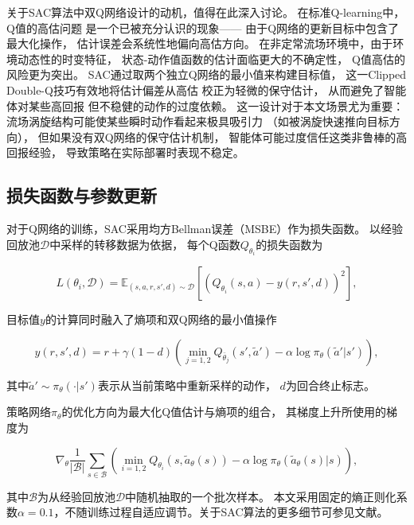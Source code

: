 关于SAC算法中双Q网络设计的动机，值得在此深入讨论。
在标准Q-learning中，Q值的高估问题
是一个已被充分认识的现象——
由于Q网络的更新目标中包含了最大化操作，
估计误差会系统性地偏向高估方向。
在非定常流场环境中，由于环境动态性的时变特征，
状态-动作值函数的估计面临更大的不确定性，
Q值高估的风险更为突出。
SAC通过取两个独立Q网络的最小值来构建目标值，
这一Clipped Double-Q技巧有效地将估计偏差从高估
校正为轻微的保守估计，
从而避免了智能体对某些高回报
但不稳健的动作的过度依赖。
这一设计对于本文场景尤为重要：
流场涡旋结构可能使某些瞬时动作看起来极具吸引力
（如被涡旋快速推向目标方向），
但如果没有双Q网络的保守估计机制，
智能体可能过度信任这类非鲁棒的高回报经验，
导致策略在实际部署时表现不稳定。
\subsection{损失函数与参数更新}

对于Q网络的训练，SAC采用均方Bellman误差（MSBE）作为损失函数。
以经验回放池$\mathcal{D}$中采样的转移数据为依据，
每个Q函数$Q_{\theta_i}$的损失函数为

\begin{equation}
    L(\theta_i, \mathcal{D}) = \mathbb{E}_{(s, a, r, s', d) \sim \mathcal{D}}\left[
        \left(Q_{\theta_i}(s, a) - y(r, s', d)\right)^2
    \right],
    \label{eq:q_loss}
\end{equation}

目标值$y$的计算同时融入了熵项和双Q网络的最小值操作

\begin{equation}
    y(r, s', d) = r + \gamma(1 - d)\left(
        \min_{j=1,2} Q_{\bar{\theta}_j}(s', \tilde{a}') -
        \alpha \log \pi_\theta(\tilde{a}' | s')
    \right),
    \label{eq:target_value}
\end{equation}

其中$\tilde{a}' \sim \pi_\theta(\cdot | s')$表示从当前策略中重新采样的动作，
$d$为回合终止标志。

策略网络$\pi_\theta$的优化方向为最大化Q值估计与熵项的组合，
其梯度上升所使用的梯度为

\begin{equation}
    \nabla_\theta \frac{1}{|\mathcal{B}|} \sum_{s \in \mathcal{B}}\left(
        \min_{i=1,2} Q_{\theta_i}(s, \tilde{a}_\theta(s)) -
        \alpha \log \pi_\theta(\tilde{a}_\theta(s) | s)
    \right),
    \label{eq:pi_loss}
\end{equation}

其中$\mathcal{B}$为从经验回放池$\mathcal{D}$中随机抽取的一个批次样本。
本文采用固定的熵正则化系数$\alpha = 0.1$，不随训练过程自适应调节。关于SAC算法的更多细节可参见文献\cite{haarnojaSoftActorcriticOffpolicy2018}。

